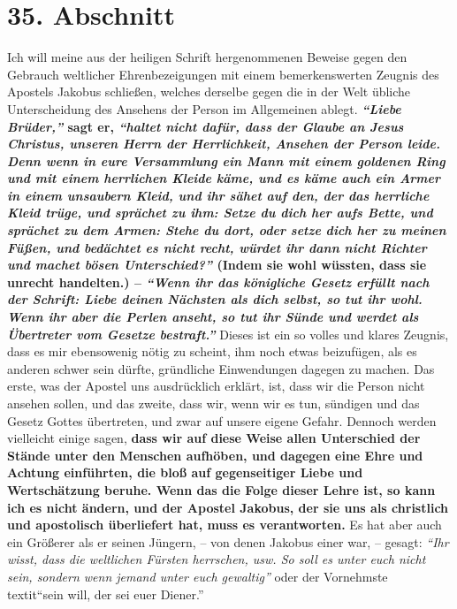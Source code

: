 \section{35. Abschnitt} \label{kap9_ab35}

Ich will meine aus der heiligen Schrift hergenommenen Beweise gegen den Gebrauch
weltlicher Ehrenbezeigungen mit einem bemerkenswerten Zeugnis des Apostels
Jakobus schließen, welches derselbe gegen die in der Welt übliche Unterscheidung
des Ansehens der Person im Allgemeinen ablegt. 
\textbf{\textit{"`Liebe Brüder,"'} sagt er,
\textit{"`haltet nicht dafür, dass der Glaube an Jesus Christus, unseren Herrn
der
Herrlichkeit, Ansehen der Person leide. Denn wenn in eure Versammlung ein Mann
mit einem goldenen Ring und mit einem herrlichen Kleide käme, und es käme auch
ein Armer in einem unsaubern Kleid, und ihr sähet auf den, der das herrliche
Kleid trüge, und sprächet zu ihm: Setze du dich her aufs Bette, und sprächet zu
dem Armen: Stehe du dort, oder setze dich her zu meinen Füßen, und bedächtet es
nicht recht, würdet ihr dann nicht Richter und machet bösen Unterschied?"'}
(Indem sie wohl wüssten, dass sie unrecht handelten.) --\textit{ "`Wenn ihr das
königliche
Gesetz erfüllt nach der Schrift: Liebe deinen Nächsten als dich selbst, so tut
ihr wohl. Wenn ihr aber die Perlen anseht, so tut ihr Sünde und werdet
als Übertreter vom Gesetze bestraft."'}}
Dieses ist
ein so volles und klares Zeugnis, dass es mir ebensowenig nötig zu scheint, ihm
noch etwas beizufügen, als es anderen schwer sein dürfte, gründliche
Einwendungen
dagegen zu machen. Das erste, was der Apostel uns ausdrücklich erklärt, ist,
dass
wir die Person nicht ansehen sollen, und das zweite, dass wir, wenn wir es tun,
sündigen und das Gesetz Gottes übertreten, und zwar auf unsere eigene Gefahr.
Dennoch werden vielleicht einige sagen, \label{ref:09_35_staende_abschaffen}
\textbf{dass wir auf diese Weise allen
Unterschied der Stände unter den Menschen aufhöben, und dagegen eine Ehre und
Achtung einführten, die bloß auf gegenseitiger Liebe und Wertschätzung beruhe.
Wenn das die Folge dieser Lehre ist, so kann ich es nicht ändern, und der
Apostel Jakobus, der sie uns als christlich und apostolisch überliefert hat,
muss es verantworten.} Es hat aber auch ein Größerer als er seinen Jüngern, --
von denen Jakobus einer war, -- gesagt:
\textit{"`Ihr wisst, dass die weltlichen Fürsten
herrschen, usw. So soll es unter euch nicht sein, sondern wenn jemand unter
euch gewaltig"'} oder der Vornehmste\\textit{"`sein will, der sei euer
Diener."'}
